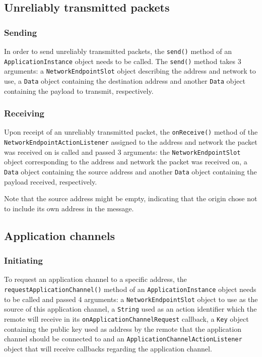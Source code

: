 \documentclass[a4paper,twoside,twocolumn,DIV=12,BCOR=1cm]{scrartcl}
\newcommand{\code}[1]{\texttt{#1}}
\begin{document}
\subsection*{Unreliably transmitted packets}
\subsubsection*{Sending}
In order to send unreliably transmitted packets, the \code{send()} method of an
\code{Application\-Instance} object needs to be called.
The \code{send()} method takes 3 arguments: a \code{Network\-Endpoint\-Slot} object
describing the address and network to use, a \code{Data} object containing the
destination address and another \code{Data} object containing the payload to
transmit, respectively.

\subsubsection*{Receiving}
Upon receipt of an unreliably transmitted packet, the \code{onReceive()} method
of the \code{Network\-Endpoint\-Action\-Listener} assigned to the address and network
the packet was received on is called and passed 3 arguments:
the \code{Network\-Endpoint\-Slot} object corresponding to the address and network
the packet was received on, a \code{Data} object containing the source address
and another \code{Data} object containing the payload received, respectively.

Note that the source address might be empty, indicating that the origin chose not
to include its own address in the message.

\subsection*{Application channels}
\subsubsection*{Initiating}
To request an application channel to a specific address, the
\code{request\-Application\-Channel()} method of an \code{Application\-Instance}
object needs to be called and passed 4 arguments: a \code{Network\-Endpoint\-Slot}
object to use as the source of this application channel, a \code{String} used as
an action identifier which the remote will receive in its
\code{on\-Application\-Channel\-Request} callback, a \code{Key} object containing the
public key used as address by the remote that the application channel should be
connected to and an \code{Application\-Channel\-Action\-Listener} object that will
receive callbacks regarding the application channel.
\end{document}
